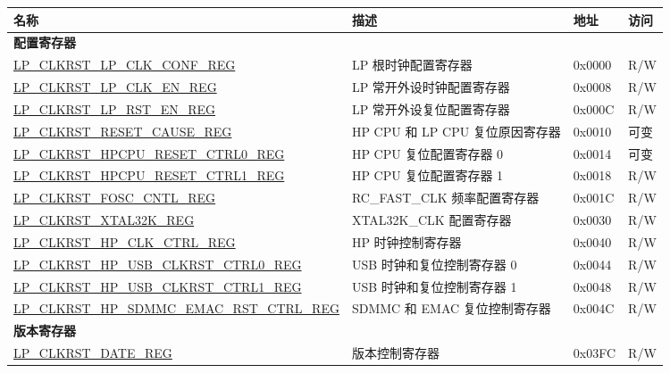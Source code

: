 \begin{longtable}{ | p{7.5cm} | p{6.2cm} | p{1.3cm} | p{1cm} | }
\hline\rowcolor{lightgray}
名称 & 描述 & 地址 & 访问 \\ \hline
\endhead
\multicolumn{4}{|l|}{\textbf{配置寄存器}} \\ \hline
\hyperref[regdesc:LPCLKRSTLPCLKCONFREG]{LP\_CLKRST\_LP\_CLK\_CONF\_REG} & LP 根时钟配置寄存器 & 0x0000 & R/W \\ \hline
\hyperref[regdesc:LPCLKRSTLPCLKENREG]{LP\_CLKRST\_LP\_CLK\_EN\_REG} & LP 常开外设时钟配置寄存器 & 0x0008 & R/W \\ \hline
\hyperref[regdesc:LPCLKRSTLPRSTENREG]{LP\_CLKRST\_LP\_RST\_EN\_REG} & LP 常开外设复位配置寄存器 & 0x000C & R/W \\ \hline
\hyperref[regdesc:LPCLKRSTRESETCAUSEREG]{LP\_CLKRST\_RESET\_CAUSE\_REG} & HP CPU 和 LP CPU 复位原因寄存器 & 0x0010 & 可变 \\ \hline
\hyperref[regdesc:LPCLKRSTHPCPURESETCTRL0REG]{LP\_CLKRST\_HPCPU\_RESET\_CTRL0\_REG} & HP CPU 复位配置寄存器 0 & 0x0014 & 可变 \\ \hline
\hyperref[regdesc:LPCLKRSTHPCPURESETCTRL1REG]{LP\_CLKRST\_HPCPU\_RESET\_CTRL1\_REG} & HP CPU 复位配置寄存器 1 & 0x0018 & R/W \\ \hline
\hyperref[regdesc:LPCLKRSTFOSCCNTLREG]{LP\_CLKRST\_FOSC\_CNTL\_REG} & RC\_FAST\_CLK 频率配置寄存器 & 0x001C & R/W \\ \hline
\hyperref[regdesc:LPCLKRSTXTAL32KREG]{LP\_CLKRST\_XTAL32K\_REG} & XTAL32K\_CLK 配置寄存器 & 0x0030 & R/W \\ \hline
\hyperref[regdesc:LPCLKRSTHPCLKCTRLREG]{LP\_CLKRST\_HP\_CLK\_CTRL\_REG} & HP 时钟控制寄存器 & 0x0040 & R/W \\ \hline
\hyperref[regdesc:LPCLKRSTHPUSBCLKRSTCTRL0REG]{LP\_CLKRST\_HP\_USB\_CLKRST\_CTRL0\_REG} & USB 时钟和复位控制寄存器 0 & 0x0044 & R/W \\ \hline
\hyperref[regdesc:LPCLKRSTHPUSBCLKRSTCTRL1REG]{LP\_CLKRST\_HP\_USB\_CLKRST\_CTRL1\_REG} & USB 时钟和复位控制寄存器 1 & 0x0048 & R/W \\ \hline
\hyperref[regdesc:LPCLKRSTHPSDMMCEMACRSTCTRLREG]{LP\_CLKRST\_HP\_SDMMC\_EMAC\_RST\_CTRL\_REG} & SDMMC 和 EMAC 复位控制寄存器 & 0x004C & R/W \\ \hline
\multicolumn{4}{|l|}{\textbf{版本寄存器}} \\ \hline
\hyperref[regdesc:LPCLKRSTDATEREG]{LP\_CLKRST\_DATE\_REG} & 版本控制寄存器 & 0x03FC & R/W \\ \hline
\end{longtable}
